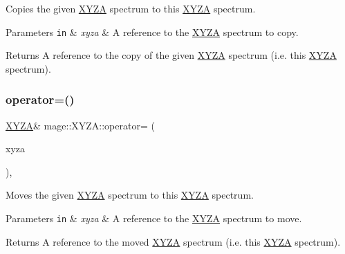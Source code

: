 Copies the given \mbox{\hyperlink{structmage_1_1_x_y_z_a}{X\+Y\+ZA}} spectrum to this \mbox{\hyperlink{structmage_1_1_x_y_z_a}{X\+Y\+ZA}} spectrum.


\begin{DoxyParams}[1]{Parameters}
\mbox{\tt in}  & {\em xyza} & A reference to the \mbox{\hyperlink{structmage_1_1_x_y_z_a}{X\+Y\+ZA}} spectrum to copy. \\
\hline
\end{DoxyParams}
\begin{DoxyReturn}{Returns}
A reference to the copy of the given \mbox{\hyperlink{structmage_1_1_x_y_z_a}{X\+Y\+ZA}} spectrum (i.\+e. this \mbox{\hyperlink{structmage_1_1_x_y_z_a}{X\+Y\+ZA}} spectrum). 
\end{DoxyReturn}
\mbox{\label{structmage_1_1_x_y_z_a_a54e3320e55516c1c0db38865a0036b47}} 
\subsubsection{\texorpdfstring{operator=()}{operator=()}\hspace{0.1cm}{\footnotesize\ttfamily [2/2]}}
{\footnotesize\ttfamily \mbox{\hyperlink{structmage_1_1_x_y_z_a}{X\+Y\+ZA}}\& mage\+::\+X\+Y\+Z\+A\+::operator= (\begin{DoxyParamCaption}\item[{\mbox{\hyperlink{structmage_1_1_x_y_z_a}{X\+Y\+ZA}} \&\&}]{xyza }\end{DoxyParamCaption})\hspace{0.3cm}{\ttfamily [default]}, {\ttfamily [noexcept]}}

Moves the given \mbox{\hyperlink{structmage_1_1_x_y_z_a}{X\+Y\+ZA}} spectrum to this \mbox{\hyperlink{structmage_1_1_x_y_z_a}{X\+Y\+ZA}} spectrum.


\begin{DoxyParams}[1]{Parameters}
\mbox{\tt in}  & {\em xyza} & A reference to the \mbox{\hyperlink{structmage_1_1_x_y_z_a}{X\+Y\+ZA}} spectrum to move. \\
\hline
\end{DoxyParams}
\begin{DoxyReturn}{Returns}
A reference to the moved \mbox{\hyperlink{structmage_1_1_x_y_z_a}{X\+Y\+ZA}} spectrum (i.\+e. this \mbox{\hyperlink{structmage_1_1_x_y_z_a}{X\+Y\+ZA}} spectrum). 
\end{DoxyReturn}
\mbox{\label{structmage_1_1_x_y_z_a_abbf1fe2475252fc2fa62588de5534dee}} 
